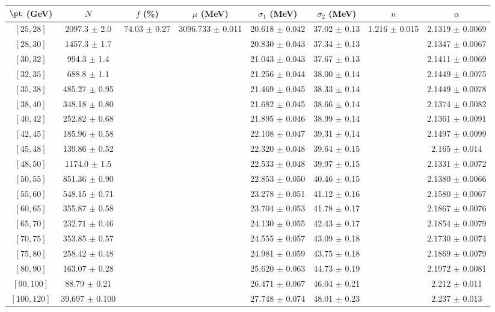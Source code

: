 \begin{tabular}{c||c|c|c|c|c|c|c}
$\pt$ (GeV) & $N$ & $f$ (\%) & $\mu$ (MeV) & $\sigma_1$ (MeV) & $\sigma_2$ (MeV) & $n$ & $\alpha$ \\
\hline
$[25, 28]$ & 2097.3 $\pm$ 2.0 & \multirow{19}{*}{74.03 $\pm$ 0.27} & \multirow{19}{*}{3096.733 $\pm$ 0.011} & 20.618 $\pm$ 0.042 & 37.02 $\pm$ 0.13 & \multirow{19}{*}{1.216 $\pm$ 0.015} & 2.1319 $\pm$ 0.0069\\
$[28, 30]$ & 1457.3 $\pm$ 1.7 &  &  & 20.830 $\pm$ 0.043 & 37.34 $\pm$ 0.13 &  & 2.1347 $\pm$ 0.0067\\
$[30, 32]$ & 994.3 $\pm$ 1.4 &  &  & 21.043 $\pm$ 0.043 & 37.67 $\pm$ 0.13 &  & 2.1411 $\pm$ 0.0069\\
$[32, 35]$ & 688.8 $\pm$ 1.1 &  &  & 21.256 $\pm$ 0.044 & 38.00 $\pm$ 0.14 &  & 2.1449 $\pm$ 0.0075\\
$[35, 38]$ & 485.27 $\pm$ 0.95 &  &  & 21.469 $\pm$ 0.045 & 38.33 $\pm$ 0.14 &  & 2.1449 $\pm$ 0.0078\\
$[38, 40]$ & 348.18 $\pm$ 0.80 &  &  & 21.682 $\pm$ 0.045 & 38.66 $\pm$ 0.14 &  & 2.1374 $\pm$ 0.0082\\
$[40, 42]$ & 252.82 $\pm$ 0.68 &  &  & 21.895 $\pm$ 0.046 & 38.99 $\pm$ 0.14 &  & 2.1361 $\pm$ 0.0091\\
$[42, 45]$ & 185.96 $\pm$ 0.58 &  &  & 22.108 $\pm$ 0.047 & 39.31 $\pm$ 0.14 &  & 2.1497 $\pm$ 0.0099\\
$[45, 48]$ & 139.86 $\pm$ 0.52 &  &  & 22.320 $\pm$ 0.048 & 39.64 $\pm$ 0.15 &  & 2.165 $\pm$ 0.014\\
$[48, 50]$ & 1174.0 $\pm$ 1.5 &  &  & 22.533 $\pm$ 0.048 & 39.97 $\pm$ 0.15 &  & 2.1331 $\pm$ 0.0072\\
$[50, 55]$ & 851.36 $\pm$ 0.90 &  &  & 22.853 $\pm$ 0.050 & 40.46 $\pm$ 0.15 &  & 2.1380 $\pm$ 0.0066\\
$[55, 60]$ & 548.15 $\pm$ 0.71 &  &  & 23.278 $\pm$ 0.051 & 41.12 $\pm$ 0.16 &  & 2.1580 $\pm$ 0.0067\\
$[60, 65]$ & 355.87 $\pm$ 0.58 &  &  & 23.704 $\pm$ 0.053 & 41.78 $\pm$ 0.17 &  & 2.1867 $\pm$ 0.0076\\
$[65, 70]$ & 232.71 $\pm$ 0.46 &  &  & 24.130 $\pm$ 0.055 & 42.43 $\pm$ 0.17 &  & 2.1854 $\pm$ 0.0079\\
$[70, 75]$ & 353.85 $\pm$ 0.57 &  &  & 24.555 $\pm$ 0.057 & 43.09 $\pm$ 0.18 &  & 2.1730 $\pm$ 0.0074\\
$[75, 80]$ & 258.42 $\pm$ 0.48 &  &  & 24.981 $\pm$ 0.059 & 43.75 $\pm$ 0.18 &  & 2.1869 $\pm$ 0.0079\\
$[80, 90]$ & 163.07 $\pm$ 0.28 &  &  & 25.620 $\pm$ 0.063 & 44.73 $\pm$ 0.19 &  & 2.1972 $\pm$ 0.0081\\
$[90, 100]$ & 88.79 $\pm$ 0.21 &  &  & 26.471 $\pm$ 0.067 & 46.04 $\pm$ 0.21 &  & 2.212 $\pm$ 0.011\\
$[100, 120]$ & 39.697 $\pm$ 0.100 &  &  & 27.748 $\pm$ 0.074 & 48.01 $\pm$ 0.23 &  & 2.237 $\pm$ 0.013\\
\end{tabular}
